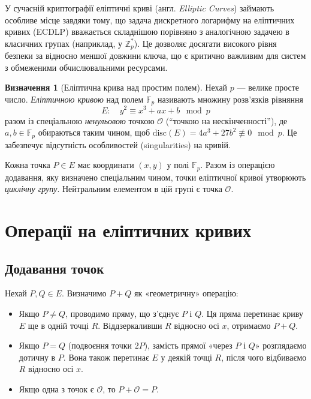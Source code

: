 \documentclass[12pt]{report}
\theoremstyle{definition}
\newtheorem{definition}{Визначення}[chapter]
\theoremstyle{plain}
\begin{document}
У сучасній криптографії еліптичні криві (англ. \textit{Elliptic Curves}) займають особливе місце завдяки тому, що задача дискретного логарифму на еліптичних кривих (ECDLP) вважається складнішою порівняно з аналогічною задачею в класичних групах (наприклад, у \(\mathbb{Z}_p^*\)). Це дозволяє досягати високого рівня безпеки за відносно меншої довжини ключа, що є критично важливим для систем з обмеженими обчислювальними ресурсами.

\begin{definition}[Еліптична крива над простим полем]
Нехай \(p\) — велике просте число. \textit{Еліптичною кривою} над полем \(\mathbb{F}_p\) називають множину розв'язків рівняння
\[
   E: \quad y^2 \equiv x^3 + a x + b \mod p
\]
разом із спеціальною \textit{ненульовою} точкою \(\mathcal{O}\) (``точкою на нескінченності''), де \(a, b \in \mathbb{F}_p\) обираються таким чином, щоб \(\text{disc}(E) = 4 a^3 + 27 b^2 \not\equiv 0 \mod p\). Це забезпечує відсутність особливостей (singularities) на кривій.
\end{definition}

Кожна точка \(P \in E\) має координати \((x, y)\) у полі \(\mathbb{F}_p\). Разом із операцією додавання, яку визначено спеціальним чином, точки еліптичної кривої утворюють \textit{циклічну групу}. Нейтральним елементом в цій групі є точка \(\mathcal{O}\).

\section{Операції на еліптичних кривих}

\subsection{Додавання точок}
Нехай \(P, Q \in E\). Визначимо \(P + Q\) як «геометричну» операцію:
\begin{itemize}
    \item Якщо \(P \neq Q\), проводимо пряму, що з'єднує \(P\) і \(Q\). Ця пряма перетинає криву \(E\) ще в одній точці \(R\). Віддзеркаливши \(R\) відносно осі \(x\), отримаємо \(P+Q\).
    \item Якщо \(P = Q\) (подвоєння точки \(2P\)), замість прямої «через \(P\) і \(Q\)» розглядаємо дотичну в \(P\). Вона також перетинає \(E\) у деякій точці \(R\), після чого відбиваємо \(R\) відносно осі \(x\).
    \item Якщо одна з точок є \(\mathcal{O}\), то \(P + \mathcal{O} = P\).
\end{itemize}
\end{document}
